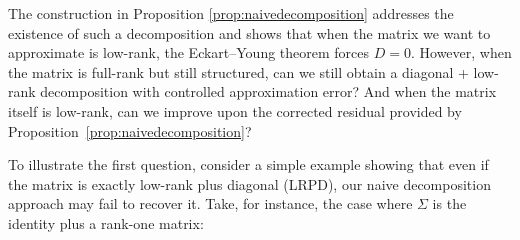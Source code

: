 \documentclass[final,hidelinks,onefignum,onetabnum]{siamart250211}
\providecommand{\1}{\mathbf{1}}
\theoremstyle{plain}
\begin{document}
The construction in Proposition \ref{prop:naivedecomposition} addresses the existence of such a decomposition and shows that when the matrix we want to approximate is low-rank, the Eckart–Young theorem forces \( D = 0 \). However, when the matrix is full-rank but still structured, can we still obtain a diagonal + low-rank decomposition with controlled approximation error? And when the matrix itself is low-rank, can we improve upon the corrected residual provided by Proposition~\ref{prop:naivedecomposition}?

To illustrate the first question, consider a simple example showing that even if the matrix is exactly low-rank plus diagonal (LRPD), our naive decomposition approach may fail to recover it. Take, for instance, the case where \(\Sigma\) is the identity plus a rank-one matrix:
\end{document}
